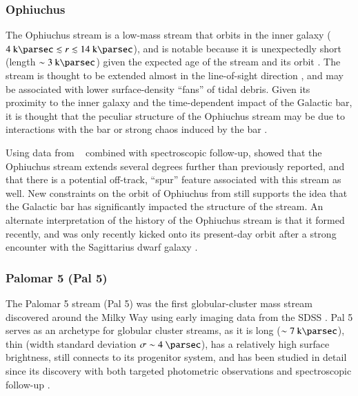 \documentclass[final,5p,times,twocolumn,authoryear]{elsarticle}
\begin{document}
\subsubsection{Ophiuchus}
\label{sec:ophiuchus}

The Ophiuchus stream is a low-mass stream that orbits in the inner galaxy ($4~\kpc
\lesssim r \lesssim 14~\kpc$), and is notable because it is unexpectedly short (length
$\sim 3~\kpc$) given the expected age of the stream and its orbit \citep{bernard:2014,
sesar:2015}.
The stream is thought to be extended almost in the line-of-sight direction
\citep{sesar:2016}, and may be associated with lower surface-density ``fans'' of tidal
debris.
Given its proximity to the inner galaxy and the time-dependent impact of the Galactic
bar, it is thought that the peculiar structure of the Ophiuchus stream may be due to
interactions with the bar or strong chaos induced by the bar \citep{sesar:2016,
price-whelan:2016b}.

Using data from \gaia\  combined with spectroscopic follow-up,
\citet{caldwell:2020} showed that the Ophiuchus stream extends several degrees further
than previously reported, and that there is a potential off-track, ``spur'' feature
associated with this stream as well.
New constraints on the orbit of Ophiuchus from \citet{caldwell:2020} still supports the
idea that the Galactic bar has significantly impacted the structure of the stream.
An alternate interpretation of the history of the Ophiuchus stream is that it formed
recently, and was only recently kicked onto its present-day orbit after a strong
encounter with the Sagittarius dwarf galaxy \citep{lane:2020}.



\subsubsection{Palomar 5 (Pal 5)}
\label{sec:pal5}

The Palomar 5 stream (Pal 5) was the first globular-cluster mass stream discovered
around the Milky Way using early imaging data from the SDSS \citep{odenkirchen:2001,
rockosi:2002, grillmair:2006-pal5}.
Pal 5 serves as an archetype for globular cluster streams, as it is long ($\sim
7~\kpc$), thin (width standard deviation $\sigma \sim 4~\unit{\parsec}$), has a
relatively high surface brightness, still connects to its progenitor system, and has
been studied in detail since its discovery with both targeted photometric observations
\citep{ibata:2016, bonaca:2020} and spectroscopic follow-up \citep{kuzma:2015,
ishigaki:2016, ibata:2017, kuzma:2022}.
\end{document}
